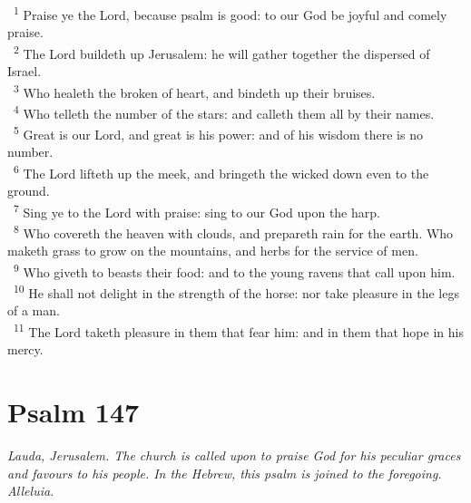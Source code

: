 \documentclass[a5paper,12pt]{article}
\begin{document}
\begin{multicols*}{2}
~\textsuperscript{1} Praise ye the Lord, because psalm is good: to our God be joyful and comely praise.\\
~\textsuperscript{2} The Lord buildeth up Jerusalem: he will gather together the dispersed of Israel.\\
~\textsuperscript{3} Who healeth the broken of heart, and bindeth up their bruises.\\
~\textsuperscript{4} Who telleth the number of the stars: and calleth them all by their names.\\
~\textsuperscript{5} Great is our Lord, and great is his power: and of his wisdom there is no number.\\
~\textsuperscript{6} The Lord lifteth up the meek, and bringeth the wicked down even to the ground.\\
~\textsuperscript{7} Sing ye to the Lord with praise: sing to our God upon the harp.\\
~\textsuperscript{8} Who covereth the heaven with clouds, and prepareth rain for the earth. Who maketh grass to grow on the mountains, and herbs for the service of men.\\
~\textsuperscript{9} Who giveth to beasts their food: and to the young ravens that call upon him.\\
~\textsuperscript{10} He shall not delight in the strength of the horse: nor take pleasure in the legs of a man.\\
~\textsuperscript{11} The Lord taketh pleasure in them that fear him: and in them that hope in his mercy.\\

\section{Psalm 147}
\label{sec:org322ab0d}
\emph{Lauda, Jerusalem. The church is called upon to praise God for his peculiar graces and favours to his people. In the Hebrew, this psalm is joined to the foregoing. Alleluia.}\\


\end{multicols*}
\end{document}
